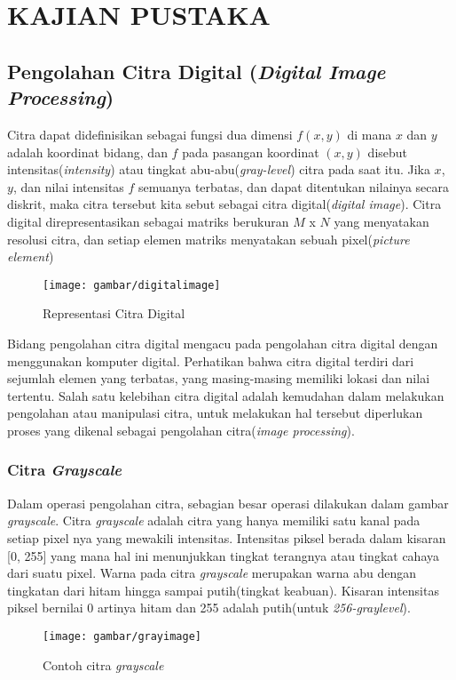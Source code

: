 
\chapter{KAJIAN PUSTAKA}                


\section{Pengolahan Citra Digital (\emph{Digital Image Processing})}
Citra dapat didefinisikan sebagai fungsi dua dimensi $f(x,y)$ di mana $x$ dan $y$ adalah koordinat bidang, dan $f$ pada pasangan koordinat $(x,y)$ disebut intensitas(\emph{intensity}) atau tingkat abu-abu(\emph{gray-level}) citra pada saat itu. Jika $x$, $y$, dan nilai intensitas $f$ semuanya terbatas, dan dapat ditentukan nilainya secara diskrit, maka citra tersebut kita sebut sebagai citra digital(\emph{digital image}). Citra digital direpresentasikan sebagai matriks berukuran $M$ x $N$ yang menyatakan resolusi citra, dan setiap elemen matriks menyatakan sebuah pixel(\emph{picture element})
\begin{figure}[H]
	\centering
	\texttt{[image: gambar/digitalimage]}
	\caption{Representasi Citra Digital}
	\label{Gambar:digitalimage}
\end{figure}
Bidang pengolahan citra digital mengacu pada pengolahan citra digital dengan menggunakan komputer digital. Perhatikan bahwa citra digital terdiri dari sejumlah elemen yang terbatas, yang masing-masing memiliki lokasi dan nilai tertentu. Salah satu kelebihan citra digital adalah kemudahan dalam melakukan pengolahan atau manipulasi citra, untuk melakukan hal tersebut diperlukan proses yang dikenal sebagai pengolahan citra(\emph{image processing})\citep{gonzalez2002digital}.
\subsection{Citra \emph{Grayscale}}
Dalam operasi pengolahan citra, sebagian besar operasi dilakukan dalam gambar \emph{grayscale}\citep{tyagi2018understanding}. Citra \emph{grayscale} adalah citra yang hanya memiliki satu kanal pada setiap pixel nya yang mewakili intensitas. Intensitas piksel berada dalam kisaran [0, 255] yang mana hal ini menunjukkan tingkat terangnya atau tingkat cahaya dari suatu pixel. Warna pada citra \emph{grayscale} merupakan warna abu dengan tingkatan dari hitam hingga sampai putih(tingkat keabuan). Kisaran intensitas piksel bernilai 0 artinya hitam dan 255 adalah putih(untuk \emph{256-graylevel}).
\begin{figure}[H]
	\centering
	\texttt{[image: gambar/grayimage]}
	\caption{Contoh citra \emph{grayscale}}
	\label{Gambar:grayimage}
\end{figure}

